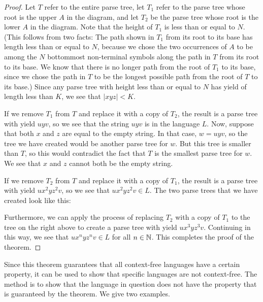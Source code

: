 \begin{proof}
Let $T$ refer to the entire parse tree, let $T_1$ refer to the 
parse tree whose root is the upper $A$ in the diagram, and 
let $T_2$ be the parse tree whose root is the lower $A$ in
the diagram.  Note that the height of $T_1$ is less than 
or equal to $N$.  (This follows from two facts:  The path shown in
$T_1$ from its root to its base has length less than or equal to
$N$, because we chose the two occurrences of $A$ to be among the $N$
bottommost non-terminal symbols along the path in $T$ from its
root to its base.  We know that there is no longer path from
the root of $T_1$ to its base, since we chose the path in $T$
to be the longest possible path from the root of $T$ to its base.)
Since any parse tree with height less than or equal to $N$ has
yield of length less than $K$, we see that $|xyz|<K$.

If we remove $T_1$ from $T$ and replace it with
a copy of $T_2$, the result is a parse tree with
yield $uyv$, so we see that the string $uyv$ is in the language
$L$.  
Now, suppose that both $x$ and $z$ are equal to the
empty string.  In that case, $w=uyv$, so the tree we have
created would be another parse tree for $w$.  But this tree
is smaller than $T$, so this would contradict the fact that
$T$ is the smallest parse tree for $w$.  We see that
$x$ and $z$ cannot both be the empty string.

If we remove $T_2$ from $T$ and replace it with a copy
of $T_1$, the result is a parse tree with yield $ux^2yz^2v$,
so we see that $ux^2yz^2v\in L$.  The two parse trees that
we have created look like this:

\medskip
\centerline{}
\smallskip

\noindent Furthermore, we can apply the process of replacing
$T_2$ with a copy of $T_1$ to the tree on the right above to
create a parse tree with yield $ux^3yz^3v$.  Continuing in this
way, we see that $ux^nyz^nv\in L$ for all $n\in{\mathbb N}$.
This completes the proof of the theorem.
\end{proof}


Since this theorem guarantees that all context-free languages
have a certain property, it can be used to show that specific
languages are not context-free.  The method is to show that
the language in question does not have the property that is
guaranteed by the theorem.  We give two examples.

